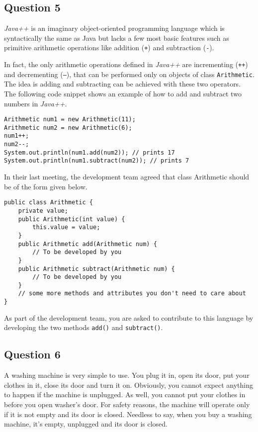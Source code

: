 \documentclass[12pt,letterpaper,twoside]{article}
\begin{document}
\newpage

\subsection*{Question 5}

\textit{Java++} is an imaginary object-oriented programming language which is syntactically the same as Java but lacks a few most basic features such as primitive arithmetic operations like addition (\texttt{+}) and subtraction (\texttt{-}).

In fact, the only arithmetic operations defined in \textit{Java++} are incrementing (\texttt{++}) and decrementing (\texttt{--}), that can be performed only on objects of class \texttt{Arithmetic}. The idea is adding and subtracting can be achieved with these two operators. The following code snippet shows an example of how to add and subtract two numbers in \textit{Java++}.

\begin{lstlisting}
Arithmetic num1 = new Arithmetic(11);
Arithmetic num2 = new Arithmetic(6);
num1++;
num2--;
System.out.println(num1.add(num2)); // prints 17
System.out.println(num1.subtract(num2)); // prints 7
\end{lstlisting}

In their last meeting, the development team agreed that class Arithmetic should be of the form given below.

\begin{lstlisting}
public class Arithmetic {
	private value;
	public Arithmetic(int value) {
		this.value = value;
	}
	public Arithmetic add(Arithmetic num) {
		// To be developed by you
	}
	public Arithmetic subtract(Arithmetic num) {
		// To be developed by you
	}
	// some more methods and attributes you don't need to care about
}
\end{lstlisting}

As part of the development team, you are asked to contribute to this language by developing the two methods \texttt{add()} and \texttt{subtract()}.
\newpage

\subsection*{Question 6}

A washing machine is very simple to use. You plug it in, open its door, put your clothes in it, close its door and turn it on. Obviously, you cannot expect anything to happen if the machine is unplugged. As well, you cannot put your clothes in before you open washer's door. For safety reasons, the machine will operate only if it is not empty and its door is closed. Needless to say, when you buy a washing machine, it's empty, unplugged and its door is closed.
\end{document}
